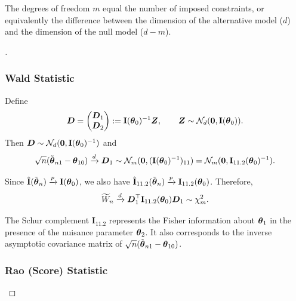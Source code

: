 \begin{remark}
The degrees of freedom $m$ equal the number of imposed constraints, or equivalently the difference between the dimension
of the alternative model ($d$) and the dimension of the null model ($d-m$).
\end{remark}

\begin{proof}[]
\subsubsection*{Wald Statistic}

Define
\begin{equation*}
\boldsymbol{D}
=
\begin{pmatrix}
\boldsymbol{D}_1 \\
\boldsymbol{D}_2
\end{pmatrix}
:=
\mathbf{I}(\boldsymbol{\theta}_0)^{-1} \boldsymbol{Z},
\qquad
\boldsymbol{Z} \sim \mathcal{N}_d(\boldsymbol{0}, \mathbf{I}(\boldsymbol{\theta}_0)).
\end{equation*}
Then $\boldsymbol{D} \sim \mathcal{N}_d(\boldsymbol{0}, \mathbf{I}(\boldsymbol{\theta}_0)^{-1})$ and
\begin{equation*}
\sqrt{n}(\tilde{\boldsymbol{\theta}}_{n1} - \boldsymbol{\theta}_{10})
\xrightarrow{d}
\boldsymbol{D}_1
\sim
\mathcal{N}_m(\boldsymbol{0}, (\mathbf{I}(\boldsymbol{\theta}_0)^{-1})_{11})
=
\mathcal{N}_m(\boldsymbol{0}, \mathbf{I}_{11.2}(\boldsymbol{\theta}_0)^{-1}).
\end{equation*}

Since $\hat{\mathbf{I}}(\tilde{\boldsymbol{\theta}}_n) \xrightarrow{p} \mathbf{I}(\boldsymbol{\theta}_0)$, we also have
$\hat{\mathbf{I}}_{11.2}(\tilde{\boldsymbol{\theta}}_n) \xrightarrow{p} \mathbf{I}_{11.2}(\boldsymbol{\theta}_0)$.
Therefore,
\begin{equation*}
\widetilde{W}_n
\xrightarrow{d}
\boldsymbol{D}_1^\top \mathbf{I}_{11.2}(\boldsymbol{\theta}_0)\boldsymbol{D}_1
\sim
\chi^2_m .
\end{equation*}

\begin{note}
The Schur complement $\mathbf{I}_{11.2}$ represents the Fisher information about $\boldsymbol{\theta}_1$ in the presence of the nuisance
parameter $\boldsymbol{\theta}_2$. It also corresponds to the inverse asymptotic covariance matrix of $\sqrt{n}(\tilde{\boldsymbol{\theta}}_{n1}-\boldsymbol{\theta}_{10})$.
\end{note}

\subsubsection*{Rao (Score) Statistic}


\end{proof}

